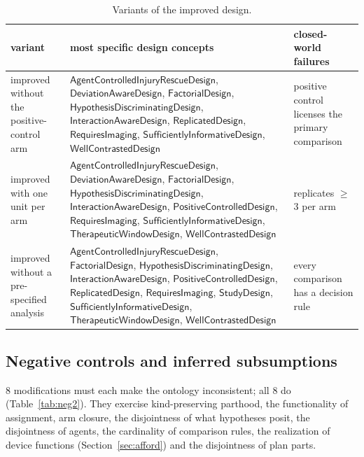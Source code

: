 \documentclass[10pt,a4paper]{article}
\begin{document}
\begin{table}[tbp]\centering\footnotesize
\caption{Variants of the improved design.}\label{tab:variants}
\begin{tabularx}{\linewidth}{@{}p{3.8cm}Xp{3.4cm}@{}}\toprule variant & most specific design concepts & closed-world failures \\ \midrule
improved without the positive-control arm & $\mathsf{AgentControlledInjuryRescueDesign}$, $\mathsf{DeviationAwareDesign}$, $\mathsf{FactorialDesign}$, $\mathsf{HypothesisDiscriminatingDesign}$, $\mathsf{InteractionAwareDesign}$, $\mathsf{ReplicatedDesign}$, $\mathsf{RequiresImaging}$, $\mathsf{SufficientlyInformativeDesign}$, $\mathsf{WellContrastedDesign}$ & positive control licenses the primary comparison \\
improved with one unit per arm & $\mathsf{AgentControlledInjuryRescueDesign}$, $\mathsf{DeviationAwareDesign}$, $\mathsf{FactorialDesign}$, $\mathsf{HypothesisDiscriminatingDesign}$, $\mathsf{InteractionAwareDesign}$, $\mathsf{PositiveControlledDesign}$, $\mathsf{RequiresImaging}$, $\mathsf{SufficientlyInformativeDesign}$, $\mathsf{TherapeuticWindowDesign}$, $\mathsf{WellContrastedDesign}$ & replicates $\geq$ 3 per arm \\
improved without a pre-specified analysis & $\mathsf{AgentControlledInjuryRescueDesign}$, $\mathsf{FactorialDesign}$, $\mathsf{HypothesisDiscriminatingDesign}$, $\mathsf{InteractionAwareDesign}$, $\mathsf{PositiveControlledDesign}$, $\mathsf{ReplicatedDesign}$, $\mathsf{RequiresImaging}$, $\mathsf{StudyDesign}$, $\mathsf{SufficientlyInformativeDesign}$, $\mathsf{TherapeuticWindowDesign}$, $\mathsf{WellContrastedDesign}$ & every comparison has a decision rule \\
\bottomrule\end{tabularx}\end{table}


\subsection{Negative controls and inferred subsumptions}
8 modifications must each make the ontology inconsistent; all 8 do (Table~\ref{tab:neg2}). They
exercise kind-preserving parthood, the functionality of assignment, arm closure, the disjointness of what hypotheses
posit, the disjointness of agents, the cardinality of comparison rules, the realization of device functions
(Section~\ref{sec:afford}) and the disjointness of plan parts.
\end{document}

